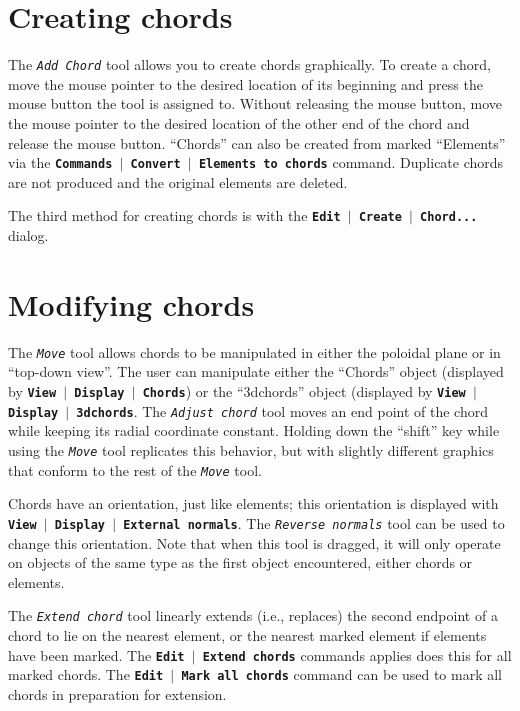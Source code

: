 \documentclass[12pt]{report}
\begin{document}
\section{Creating chords}

The \textit{\texttt{Add Chord}} tool 
allows you to create chords graphically.  To
create a chord, move the mouse pointer to the desired location of its
beginning and press the mouse button the tool is assigned to. Without
releasing the mouse button, move the mouse pointer to the desired
location of the other end of the chord and release the mouse button.
``Chords'' can also be created from marked ``Elements'' via the 
\textbf{\texttt{Commands $\mid$ Convert $\mid$ Elements to chords}}
command.  Duplicate chords are not produced and the 
original elements are deleted.

The third method for creating chords is with the 
\textbf{\texttt{Edit $\mid$ Create $\mid$ Chord...}} dialog.

\section{Modifying chords}

The \textit{\texttt{Move}} tool allows chords to be manipulated in either
the poloidal plane or in ``top-down view''.  The user can
manipulate either the ``Chords'' object (displayed by
\textbf{\texttt{View $\mid$ Display $\mid$ Chords}}) or the
``3dchords'' object 
(displayed by \textbf{\texttt{View $\mid$ Display $\mid$ 3dchords}}.
The \textit{\texttt{Adjust chord}} tool moves an end point of the chord
while keeping its radial coordinate constant.  Holding down the
``shift'' key while using the \textit{\texttt{Move}} 
tool replicates this behavior,
but with slightly
different graphics that conform to the rest of the \textit{\texttt{Move}} 
tool.

Chords have an orientation, just like elements; this
orientation is displayed with 
\textbf{\texttt{View $\mid$ Display $\mid$ External normals}}.
The \textit{\texttt{Reverse normals}} tool can be used to change this 
orientation. Note that when this tool is dragged, it will only
operate on objects of the same type as the
first object encountered, either chords or elements. 

The \textit{\texttt{Extend chord}} tool linearly
extends (i.e., replaces) the second endpoint  of a chord to lie on
the nearest element, or the nearest marked element if elements have
been marked.  The
\textbf{\texttt{Edit $\mid$ Extend chords}} commands applies does
this for all marked chords.  The 
\textbf{\texttt{Edit $\mid$ Mark all chords}} command can be used
to mark all chords in preparation for extension.
\end{document}
